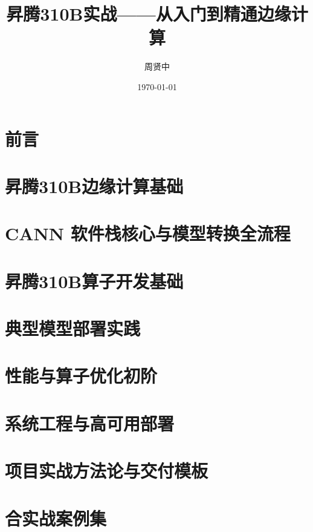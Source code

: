 \documentclass[fontsize=12pt, paper=a4, twoside, openright, DIV=calc]{scrbook}
\title{昇腾310B实战——从入门到精通边缘计算}
\author{周贤中}
\date{\today}
\theoremstyle{break}
\begin{document}
\maketitle

\frontmatter
\chapter*{前言}



\tableofcontents

\mainmatter


\chapter{昇腾310B边缘计算基础}


\chapter{CANN 软件栈核心与模型转换全流程}


\chapter{昇腾310B算子开发基础}
% 

\chapter{典型模型部署实践}
% 

\chapter{性能与算子优化初阶}
% 

\chapter{系统工程与高可用部署}
% 

\chapter{项目实战方法论与交付模板}
% 

\chapter{合实战案例集}
% 
\end{document}
